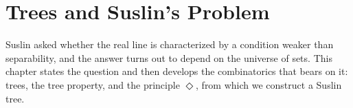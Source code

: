 \chapter{Trees and Suslin's Problem} \label{Ch5:CH}
\thispagestyle{empty}

Suslin asked whether the real line is characterized by a condition weaker than separability, and the answer turns out to depend on the universe of sets. This chapter states the question and then develops the combinatorics that bears on it: trees, the tree property, and the principle $\Diamond$, from which we construct a Suslin tree.







